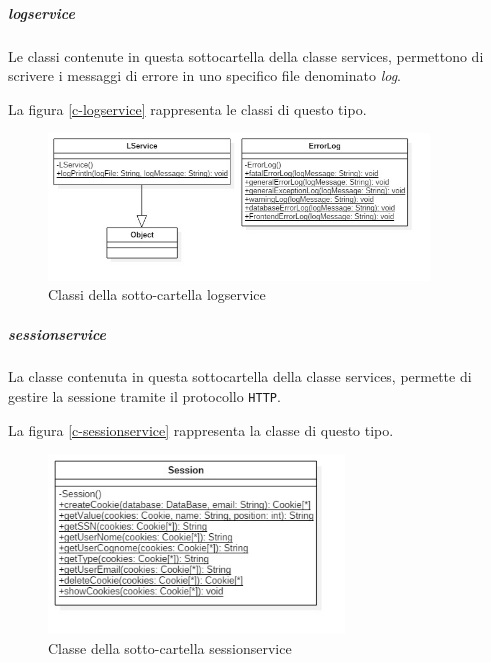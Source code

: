 	
	\subparagraph{logservice}
	Le classi contenute in questa sottocartella della classe services, permettono di scrivere i messaggi di errore in uno specifico file denominato \emph{log}.
	
	La figura \vref{c-logservice} rappresenta le classi di questo tipo.
	
	\begin{figure}[h]
		\centering
		\includegraphics[width=0.9\textwidth]
		{immagini/c-logservice}
		
		\caption{Classi della sotto-cartella logservice}
		\label{c-logservice}
	\end{figure}
	
	
	\subparagraph{sessionservice}
	La classe contenuta in questa sottocartella della classe services, permette di gestire la sessione tramite il protocollo \texttt{HTTP}.
	
	La figura \vref{c-sessionservice} rappresenta la classe di questo tipo.
	
	\begin{figure}[h]
		\centering
		\includegraphics[width=0.7\textwidth]
		{immagini/c-sessionservice}
		
		\caption{Classe della sotto-cartella sessionservice}
		\label{c-sessionservice}
	\end{figure}
	
	
	\clearpage
	

